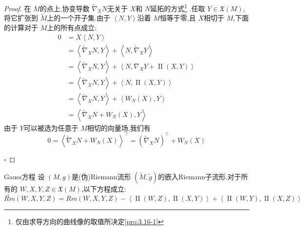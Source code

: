 \documentclass[../../几何与拓扑.tex]{subfiles}
\begin{document}
\begin{proof}
    在 \(  M  \)的点上,协变导数 \(   \tilde{\nabla} _{X}N  \)无关于  \(  X  \)和 \(  N  \)延拓的方式\footnote{仅由求导方向的曲线像的取值所决定\ref{pro:3.16-1}  }  .任取 \(  Y \in \mathfrak{X}\left( M \right)   \),将它扩张到 \(  \tilde{M}  \)上的一个开子集.由于 \(  \left<N,Y \right>  \)沿着 \(  M  \)恒等于零,且 \(  X  \)相切于 \(  M  \),下面的计算对于 \(  M  \)上的所有点成立: \[
    \begin{aligned}
    0& =  X\left<N,Y \right>\\ 
     & = \left< \tilde{\nabla} _{X}N,Y \right>+ \left<N, \tilde{\nabla} _{X}Y \right>\\ 
      & = \left< \tilde{\nabla} _{X}N,Y \right>+ \left<N,  \nabla _{X}Y+ \operatorname{II}\left( X,Y \right)  \right>\\ 
       & = \left< \tilde{\nabla} _{X}N,Y \right>+ \left<N,\operatorname{II}\left( X,Y \right)  \right>\\
       & = \left< \tilde{\nabla} _{X}N,Y \right>+  \left<W_{N}\left( X \right),Y  \right>\\ 
        & = \left< \tilde{\nabla} _{X}N+ W_{N}\left( X \right),Y  \right>
    \end{aligned}
    \]       由于 \(  Y  \)可以被选为任意于 \(  M  \)相切的向量场,我们有 \[
    0= \left< \tilde{\nabla} _{X}N+ W_{N}\left( X \right)  \right>^{\top}= \left(  \tilde{\nabla} _{X}N \right)^{\top}+ W_{N}\left( X \right)  
    \]  

    \hfill $\square$
\end{proof}


\begin{theorem}{Gauss方程}
    设 \(  \left( M,g \right)   \)是(伪)Riemann流形 \(  \left( \tilde{M}, \tilde{g}  \right)   \)的嵌入Riemann子流形.对于所有的 \(  W,X,Y,Z \in \mathfrak{X}\left( M \right)   \),以下方程成立: \[
    \widetilde{Rm}\left( W,X,Y,Z \right)=  Rm\left( W,X,Y,Z \right)- \left<\operatorname{II}\left( W,Z \right),\operatorname{II}\left( X,Y \right)   \right>+ \left<\operatorname{II}\left( W,Y \right),\operatorname{II}\left( X,Z \right)   \right>  
    \]   
\end{theorem}
\end{document}
